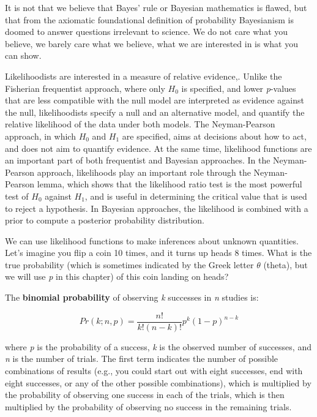 \documentclass[
  oneside]{krantz}
\renewenvironment{quote}{\begin{VF}}{\end{VF}}
\begin{document}
\begin{quote}
It is not that we believe that Bayes' rule or Bayesian mathematics is flawed, but that from the axiomatic foundational definition of probability Bayesianism is doomed to answer questions irrelevant to science. We do not care what you believe, we barely care what we believe, what we are interested in is what you can show.
\end{quote}

Likelihoodists are interested in a measure of relative evidence,. Unlike the Fisherian frequentist approach, where only \(H_0\) is specified, and lower \emph{p}-values that are less compatible with the null model are interpreted as evidence against the null, likelihoodists specify a null and an alternative model, and quantify the relative likelihood of the data under both models. The Neyman-Pearson approach, in which \(H_0\) and \(H_1\) are specified, aims at decisions about how to act, and does not aim to quantify evidence. At the same time, likelihood functions are an important part of both frequentist and Bayesian approaches. In the Neyman-Pearson approach, likelihoods play an important role through the Neyman-Pearson lemma, which shows that the likelihood ratio test is the most powerful test of \(H_0\) against \(H_1\), and is useful in determining the critical value that is used to reject a hypothesis. In Bayesian approaches, the likelihood is combined with a prior to compute a posterior probability distribution.

We can use likelihood functions to make inferences about unknown quantities. Let's imagine you flip a coin 10 times, and it turns up heads 8 times. What is the true probability (which is sometimes indicated by the Greek letter \(\theta\) (theta), but we will use \emph{p} in this chapter) of this coin landing on heads?

The \textbf{binomial probability} of observing \emph{k} successes in \emph{n} studies is:

\[
Pr\left( k;n, p \right) = \frac{n!}{k!\left( n - k \right)!}p^{k}{(1 - p)}^{n - k}
\]

where \emph{p} is the probability of a success, \emph{k} is the observed number of successes, and \emph{n} is the number of trials. The first term indicates the number of possible combinations of results (e.g., you could start out with eight successes, end with eight successes, or any of the other possible combinations), which is multiplied by the probability of observing one success in each of the trials, which is then multiplied by the probability of observing no success in the remaining trials.
\end{document}
